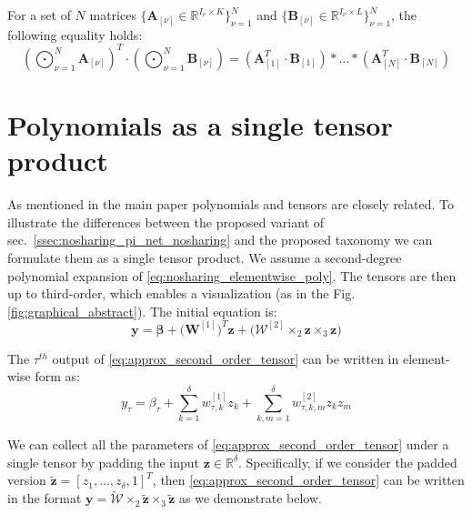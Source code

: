 \documentclass[runningheads]{llncs}
\newcommand{\realnum}{\mathbb{R}}
\providecommand{\bmcal}[1]{\bm{\mathcal{#1}}}
\providecommand{\matnot}[1]{_{[{#1}]}}
\providecommand{\invar}{z}
\providecommand{\binvar}{\bm{\invar}}
\providecommand{\citet}{\cite}
\begin{document}
\begin{lemma} [\citet{chrysos2019polygan}]
For a set of $N$ matrices $\{\bm{A}\matnot{\nu} \in \realnum^{I_{\nu} \times K} \}_{\nu=1}^N$  and $\{\bm{B}\matnot{\nu} \in \realnum^{I_{\nu} \times L} \}_{\nu=1}^N$, the following equality holds:
\begin{equation}
    (\bigodot_{\nu=1}^N \bm{A}\matnot{\nu})^T \cdot (\bigodot_{\nu=1}^N \bm{B}\matnot{\nu}) = (\bm{A}\matnot{1}^T \cdot \bm{B}\matnot{1}) * \ldots * (\bm{A}\matnot{N}^T \cdot \bm{B}\matnot{N})
\label{eq:polygan_suppl_lemma1_N}
\end{equation}
\label{lemma:polygan_lemma_hadamard_kr2}
\end{lemma}









\section{Polynomials as a single tensor product}
\label{ssec:nosharing_explanation_motivational_figure}

As mentioned in the main paper polynomials and tensors are closely related. To illustrate the differences between the proposed variant of sec.~\ref{ssec:nosharing_pi_net_nosharing} and the proposed taxonomy we can formulate them as a single tensor product. We assume a second-degree polynomial expansion of \eqref{eq:nosharing_elementwise_poly}. The tensors are then up to third-order, which enables a visualization (as in the Fig.\ref{fig:graphical_abstract}). The initial equation is: 
\begin{equation}
    \bm{y} = \bm{\beta} + \Big(\bm{W}^{[1]}\Big)^T \binvar + \bigg(\bmcal{W}^{[2]} \times_{2} \binvar \times_{3} \binvar \bigg)
    \label{eq:approx_second_order_tensor}
\end{equation}

The $\tau^{th}$ output of \eqref{eq:approx_second_order_tensor} can be written in element-wise form as:
\begin{equation}
    y_{\tau} = {\beta}_{\tau} + \sum_{k=1}^{\delta} w^{[1]}_{\tau, k} \invar_k + \sum_{k, m = 1}^{\delta} w^{[2]}_{\tau, k, m} \invar_k \invar_m
    \label{eq:approx_second_order_elementwise}
\end{equation}

We can collect all the parameters of \eqref{eq:approx_second_order_tensor} under a single tensor by padding the input $\binvar \in \realnum^{\delta}$. Specifically, if we consider the padded version $\tilde{\binvar} = [\invar_1, \dots, \invar_{\delta}, 1]^T$, then \eqref{eq:approx_second_order_tensor} can be written in the format $\bm{y} = \tilde{\bmcal{W}}\times_{2} \tilde{\binvar} \times_{3} \tilde{\binvar}$ as we demonstrate below. 
\end{document}
